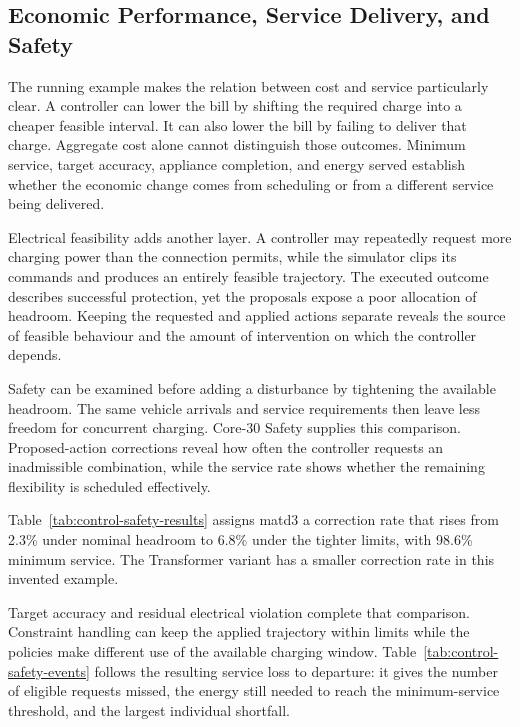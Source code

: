 \subsection{Economic Performance, Service Delivery, and Safety}

The running example makes the relation between cost and service particularly clear. A controller can lower the bill by shifting the required charge into a cheaper feasible interval. It can also lower the bill by failing to deliver that charge. Aggregate cost alone cannot distinguish those outcomes. Minimum service, target accuracy, appliance completion, and energy served establish whether the economic change comes from scheduling or from a different service being delivered.

Electrical feasibility adds another layer. A controller may repeatedly request more charging power than the connection permits, while the simulator clips its commands and produces an entirely feasible trajectory. The executed outcome describes successful protection, yet the proposals expose a poor allocation of headroom. Keeping the requested and applied actions separate reveals the source of feasible behaviour and the amount of intervention on which the controller depends.


Safety can be examined before adding a disturbance by tightening the available headroom. The same vehicle arrivals and service requirements then leave less freedom for concurrent charging. Core-30 Safety supplies this comparison. Proposed-action corrections reveal how often the controller requests an inadmissible combination, while the service rate shows whether the remaining flexibility is scheduled effectively.



\illustrativereading Table~\ref{tab:control-safety-results} assigns \gls{matd3} a correction rate that rises from 2.3\% under nominal headroom to 6.8\% under the tighter limits, with 98.6\% minimum service. The Transformer variant has a smaller correction rate in this invented example. 

Target accuracy and residual electrical violation complete that comparison. Constraint handling can keep the applied trajectory within limits while the policies make different use of the available charging window. Table~\ref{tab:control-safety-events} follows the resulting service loss to departure: it gives the number of eligible requests missed, the energy still needed to reach the minimum-service threshold, and the largest individual shortfall.

